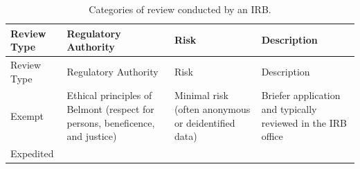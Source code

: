 \documentclass[
]{WileySix}
\begin{document}
\begin{longtable}[]{@{}llll@{}}
\caption{\label{tab:irbtable1} Categories of review conducted by an IRB.}\tabularnewline
\toprule
\begin{minipage}[b]{0.16\columnwidth}\raggedright
Review
Type\strut
\end{minipage} & \begin{minipage}[b]{0.21\columnwidth}\raggedright
Regulatory
Authority\strut
\end{minipage} & \begin{minipage}[b]{0.22\columnwidth}\raggedright
Risk\strut
\end{minipage} & \begin{minipage}[b]{0.28\columnwidth}\raggedright
Description\strut
\end{minipage}\tabularnewline
\midrule
\endfirsthead
\toprule
\begin{minipage}[b]{0.16\columnwidth}\raggedright
Review
Type\strut
\end{minipage} & \begin{minipage}[b]{0.21\columnwidth}\raggedright
Regulatory
Authority\strut
\end{minipage} & \begin{minipage}[b]{0.22\columnwidth}\raggedright
Risk\strut
\end{minipage} & \begin{minipage}[b]{0.28\columnwidth}\raggedright
Description\strut
\end{minipage}\tabularnewline
\midrule
\endhead
\begin{minipage}[t]{0.16\columnwidth}\raggedright
Exempt\strut
\end{minipage} & \begin{minipage}[t]{0.21\columnwidth}\raggedright
Ethical
principles of
Belmont
(respect for
persons,
beneficence,
and justice)\strut
\end{minipage} & \begin{minipage}[t]{0.22\columnwidth}\raggedright
Minimal risk
(often
anonymous or
deidentified
data)\strut
\end{minipage} & \begin{minipage}[t]{0.28\columnwidth}\raggedright
Briefer application
and typically
reviewed in the IRB
office\strut
\end{minipage}\tabularnewline
\begin{minipage}[t]{0.16\columnwidth}\raggedright
Expedited\strut
\end{minipage} & \begin{minipage}[t]{0.21\columnwidth}\raggedright

\end{minipage}
\end{longtable}
\end{document}
